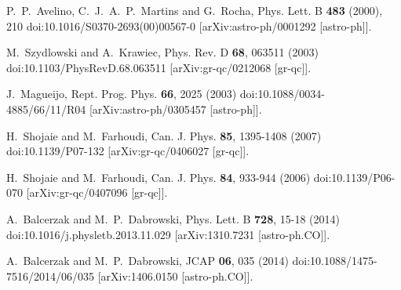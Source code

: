 \documentclass[jkps,preprint,fleqn]{revtex4} %
\begin{document}
\begin{thebibliography}{999}


P.~P.~Avelino, C.~J.~A.~P.~Martins and G.~Rocha,
Phys. Lett. B \textbf{483} (2000), 210
doi:10.1016/S0370-2693(00)00567-0
[arXiv:astro-ph/0001292 [astro-ph]].

M.~Szydlowski and A.~Krawiec,
Phys. Rev. D \textbf{68}, 063511 (2003)
doi:10.1103/PhysRevD.68.063511
[arXiv:gr-qc/0212068 [gr-qc]].

J.~Magueijo,
Rept. Prog. Phys. \textbf{66}, 2025 (2003)
doi:10.1088/0034-4885/66/11/R04
[arXiv:astro-ph/0305457 [astro-ph]].


H.~Shojaie and M.~Farhoudi,
Can. J. Phys. \textbf{85}, 1395-1408 (2007)
doi:10.1139/P07-132
[arXiv:gr-qc/0406027 [gr-qc]].

 
H.~Shojaie and M.~Farhoudi,
Can. J. Phys. \textbf{84}, 933-944 (2006)
doi:10.1139/P06-070
[arXiv:gr-qc/0407096 [gr-qc]].

A.~Balcerzak and M.~P.~Dabrowski,
Phys. Lett. B \textbf{728}, 15-18 (2014)
doi:10.1016/j.physletb.2013.11.029
[arXiv:1310.7231 [astro-ph.CO]].

A.~Balcerzak and M.~P.~Dabrowski,
JCAP \textbf{06}, 035 (2014)
doi:10.1088/1475-7516/2014/06/035
[arXiv:1406.0150 [astro-ph.CO]].


\end{thebibliography}
\end{document}
